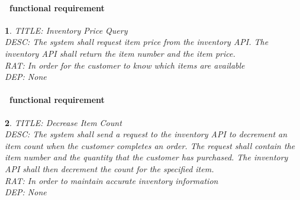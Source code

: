 \documentclass{scrreprt}
\theoremstyle{funreq}
\newtheorem{funreq}{}
\newcommand*{\reqref}[1]{\hyperref[#1]{FR\ref*{#1}}}
\begin{document}

	\paragraph[]{\Subsectionname ~functional requirement }
	\begin{funreq}
		\label{inventory_price}
		TITLE: Inventory Price Query\\
		DESC: The system shall request item price from the inventory API.  The inventory API shall return the item number and the item price.\\
		RAT: In order for the customer to know which items are available\\
		DEP: None\\
	\end{funreq}


	\paragraph[]{\Subsectionname ~functional requirement }
	\begin{funreq}
		\label{inventory_decrement}
		TITLE: Decrease Item Count\\
		DESC: The system shall send a request to the inventory API to decrement an item count when the customer completes an order.  The request shall contain the item number and the quantity that the customer has purchased.  The inventory API shall then decrement the count for the specified item.\\
		RAT: In order to maintain accurate inventory information\\
		DEP: None\\
	\end{funreq}
\end{document}
